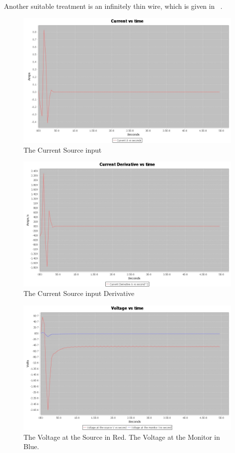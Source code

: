 \documentclass[11pt,a4paper,oldfontcommands]{memoir}
\begin{document}
Another suitable treatment is an infinitely thin wire, which is given in ~\cite{Edelvik}.

\begin{figure}
  \includegraphics[width=\linewidth]{211Current.jpg}
  \caption{The Current Source input}
  \label{fig:mesh39}
\end{figure}

\begin{figure}
  \includegraphics[width=\linewidth]{211CurrentDerivative.jpg}
  \caption{The Current Source input Derivative}
  \label{fig:mesh39}
\end{figure}

\begin{figure}
  \includegraphics[width=\linewidth]{211Voltages.jpg}
  \caption{The Voltage at the Source in Red. The Voltage at the Monitor in Blue.}
  \label{fig:mesh39}
\end{figure}





\end{document}
